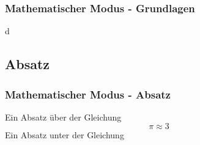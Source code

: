 \documentclass{beamer}
\begin{document}
  \begin{frame}[fragile]
   \frametitle{Mathematischer Modus - Grundlagen}
  	\begin{semiverbatim}
  	\end{semiverbatim}
  	\begin{semiverbatim}
  	\end{semiverbatim}d
  	\begin{semiverbatim}
  	\end{semiverbatim}
  	\begin{semiverbatim}
  	\end{semiverbatim}
  \end{frame}

\subsection{Absatz}
\begin{frame}[fragile]
\frametitle{Mathematischer Modus - Absatz}
  \begin{semiverbatim}
  \end{semiverbatim}
Ein Absatz über der Gleichung
\[\pi \approx 3\]
Ein Absatz unter der Gleichung
\end{frame}
\end{document}
